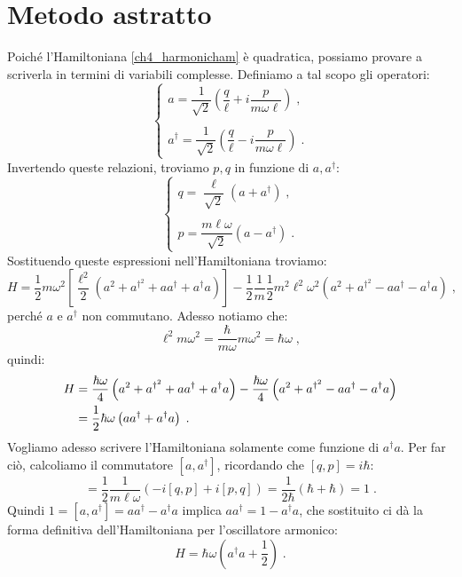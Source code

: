 \documentclass[10pt,a4paper]{report}
\theoremstyle{definition}
\numberwithin{equation}{section}
\newcommand{\adj}[1]{#1^{\dagger}}
\begin{document}
\section{Metodo astratto}
Poiché l'Hamiltoniana \eqref{ch4_harmonicham} è quadratica, possiamo provare a scriverla in termini di variabili complesse. Definiamo a tal scopo gli operatori:
\begin{equation}
\begin{cases}
a=\dfrac{1}{\sqrt{2}}\left(\dfrac{q}{\ell}+i\dfrac{p}{m\omega\ell}\right)\;, \\
\\
\adj{a}=\dfrac{1}{\sqrt{2}}\left(\dfrac{q}{\ell}-i\dfrac{p}{m\omega\ell}\right)\;.
\end{cases}
\end{equation}
Invertendo queste relazioni, troviamo $p,q$ in funzione di $a,\adj{a}$:
\begin{equation}
\begin{cases}
q=\dfrac{\ell}{\sqrt{2}}\left(a+\adj{a}\right)\;, \\
\\
p=\dfrac{m\ell\omega}{\sqrt{2}}\left(a-\adj{a}\right)\;.
\end{cases}
\end{equation}
Sostituendo queste espressioni nell'Hamiltoniana troviamo:
$$
H=\frac{1}{2}m\omega^2\left[\frac{\ell^2}{2}\left(a^2+a^{\dagger^2}+a\adj{a}+\adj{a}a\right)\right]-\frac{1}{2}\frac{1}{m}\frac{1}{2}m^2\ell^2\omega^2\left(a^2+a^{\dagger^2}-a\adj{a}-\adj{a}a\right)\;,
$$
perché $a$ e $\adj{a}$ non commutano. Adesso notiamo che:
$$
\ell^2m\omega^2=\frac{\hbar}{m\omega}m\omega^2=\hbar\omega\;,
$$
quindi:
\begin{align}
H &= \frac{\hbar\omega}{4}\left(a^2+a^{\dagger^2}+a\adj{a}+\adj{a}a\right)-\frac{\hbar\omega}{4}\left(a^2+a^{\dagger^2}-a\adj{a}-\adj{a}a\right) \notag \\
&= \frac{1}{2}\hbar\omega\left(a\adj{a}+\adj{a}a\right)\;.
\end{align}
Vogliamo adesso scrivere l'Hamiltoniana solamente come funzione di $\adj{a}a$. Per far ciò, calcoliamo il commutatore $[a,\adj{a}]$, ricordando che $[q,p]=i\hbar$:
\begin{equation}
[a,\adj{a}]=\frac{1}{2}\frac{1}{m\ell\omega}\left(-i[q,p]+i[p,q]\right)=\frac{1}{2\hbar}(\hbar+\hbar)=1\;.
\end{equation}
Quindi $1=[a,\adj{a}]=a\adj{a}-\adj{a}a$ implica $a\adj{a}=1-\adj{a}a$, che sostituito ci dà la forma definitiva dell'Hamiltoniana per l'oscillatore armonico:
\begin{equation}
H=\hbar\omega\left(\adj{a}a+\frac{1}{2}\right)\;.
\end{equation}
\end{document}
